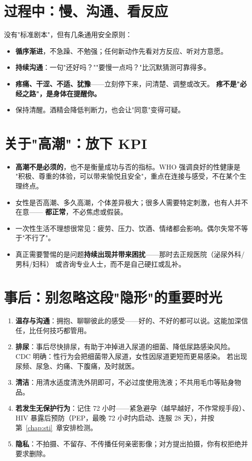 \documentclass[12pt,UTF8,openany]{ctexbook}
\begin{document}
\section{过程中：慢、沟通、看反应}

没有"标准剧本"，但有几条通用安全原则：

\begin{itemize}[leftmargin=2em]
  \item \textbf{循序渐进}，不急躁、不勉强；任何新动作先看对方反应、听对方意愿。
  \item \textbf{持续沟通}：一句"还好吗？""要慢一点吗？"比沉默猜测可靠得多。
  \item \textbf{疼痛、干涩、不适、犹豫}——立刻停下来，问清楚、调整或改天。
        \textbf{疼不是"必经之路"，是身体在提醒你。}
  \item 保持清醒。酒精会降低判断力，也会让"同意"变得可疑。
\end{itemize}

\section{关于"高潮"：放下 KPI}

\begin{itemize}[leftmargin=2em]
  \item \textbf{高潮不是必须的}，也不是衡量成功与否的指标。WHO 强调良好的性健康是
        "积极、尊重的体验，可以带来愉悦且安全"，重点在连接与感受，不在某个生理终点。
  \item 女性是否高潮、多久高潮，个体差异极大；很多人需要特定刺激，也有人并不在意——
        \textbf{都正常}，不必焦虑或假装。
  \item 一次性生活不理想很常见：疲劳、压力、饮酒、情绪都会影响。偶尔失常不等于"不行了"。
  \item 真正需要警惕的是问题\textbf{持续出现并带来困扰}——那时去正规医院（泌尿外科/男科/妇科）
        或咨询专业人士，而不是自己硬扛或乱补。
\end{itemize}

\section{事后：别忽略这段"隐形"的重要时光}

\begin{enumerate}[leftmargin=2em,itemsep=0.3em]
  \item \textbf{温存与沟通}：拥抱、聊聊彼此的感受——好的、不好的都可以说。这能加深信任，比任何技巧都管用。
  \item \textbf{排尿}：事后尽快排尿，有助于冲掉进入尿道的细菌、降低尿路感染风险。
        CDC 明确：性行为会把细菌带入尿道，女性因尿道更短而更易感染。
        若出现尿频、尿急、灼痛、下腹痛，及时就医。
  \item \textbf{清洁}：用清水适度清洗外阴即可，不必过度使用洗液；不共用毛巾等贴身物品。
  \item \textbf{若发生无保护行为}：记住 72 小时——紧急避孕（越早越好，不作常规手段）、
        HIV 暴露后预防（PEP，最晚 72 小时内启动、连服 28 天），并按第~\ref{chap:sti}~章安排检测。
  \item \textbf{隐私}：不拍摄、不留存、不传播任何亲密影像；对方提出拍摄，你有权拒绝并要求删除。
\end{enumerate}
\end{document}
